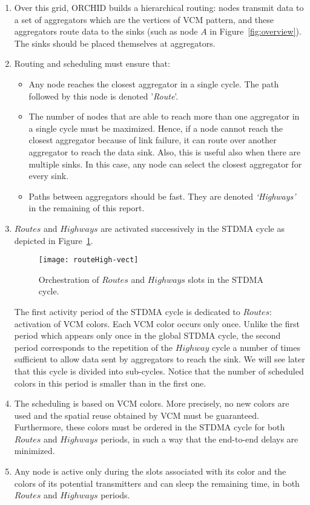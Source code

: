 \begin{enumerate}
\item 
Over this grid, ORCHID builds a hierarchical routing: nodes transmit data to a set of aggregators which are the vertices of VCM pattern, and these aggregators route data to the sinks (such as node $A$ in Figure~\ref{fig:overview}). The sinks should be placed themselves at aggregators.
\item Routing and scheduling must ensure that: 
	\begin{itemize}
	\item Any node reaches the closest aggregator in a single cycle. The path followed by this node is denoted '\textit{Route}'.
	\item The number of nodes that are able to reach more than one aggregator in a single cycle must be maximized. Hence, if a node cannot reach the closest aggregator because of link failure, it can route over another aggregator to reach the data sink. Also, this is useful also when there are multiple sinks. In this case, any node can select the closest aggregator for every sink.
\item Paths between aggregators should be fast. They are denoted \textit{`Highways'} in the remaining of this report.
		\end{itemize}              




\item $Routes$ and $Highways$ are activated successively in the STDMA cycle as depicted in Figure~\ref{routeHighways}. 
\begin{figure}[!h]
\centering
\texttt{[image: routeHigh-vect]}
\caption{Orchestration of $Routes$ and $Highways$ slots in the STDMA cycle.\label{routeHighways}}
\end{figure}
The first activity period of the STDMA cycle is dedicated to $Routes$: activation of VCM colors. Each VCM color occurs only once. 
Unlike the first period which appears only once in the global STDMA cycle, the second period corresponds to the repetition of the $Highway$ cycle a number of times sufficient to allow data sent by aggregators to reach the sink. We will see later that this cycle is divided into sub-cycles. Notice that the number of scheduled colors in this period is smaller than in the first one.
\item The scheduling is based on VCM colors. More precisely, no new colors are used and the spatial reuse obtained by VCM must be guaranteed. Furthermore, these colors must be ordered in the STDMA cycle for both $Routes$ and $Highways$ periods, in such a way that the end-to-end delays are minimized.

\item Any node is active only during the slots associated with its color and the colors of its potential transmitters and can sleep the remaining time, in both $Routes$ and $Highways$ periods.
\end{enumerate}
